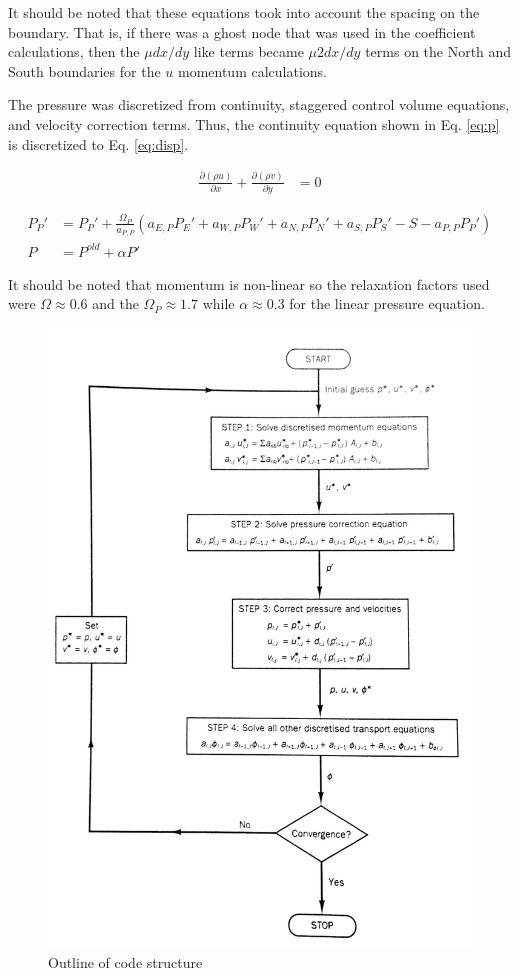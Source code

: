 \documentclass[cleanfoot,cleanhead,onecolumn,12pt,notitlepage]{asme2e}
\begin{document}
It should be noted that these equations took into account the spacing on the boundary.  That is, if there was a ghost node that was used in the coefficient calculations, then the $\mu dx/dy$ like terms became $\mu 2 dx / dy$ terms on the North and South boundaries for the $u$ momentum calculations.  

The pressure was discretized from continuity, staggered control volume equations, and velocity correction terms.   Thus, the continuity equation shown in Eq. \ref{eq:p} is discretized to Eq. \ref{eq:disp}.  

\begin{equation}
\begin{aligned}
\frac{\partial (\rho u)}{\partial x}
+
\frac{\partial (\rho v)}{\partial y} 
&= 0
\label{eq:p}
\end{aligned}
\end{equation}

\begin{equation}
\begin{aligned}
P_P' &= P_P' + \frac{\Omega_P}{a_{P,P}}
\left(a_{E,P} P_E'
	+ a_{W,P} P_W'
	+ a_{N,P} P_N'
	+ a_{S,P} P_S'
	- S
	- a_{P,P} P_P'
\right)\\
P &= P^{old} + \alpha P'
\label{eq:disp}
\end{aligned}
\end{equation}

It should be noted that momentum is non-linear so the relaxation factors used were $\Omega \approx 0.6$ and the $\Omega_P \approx 1.7$ while $\alpha \approx 0.3$ for the linear pressure equation.


\begin{figure}[h!]
\begin{center}
    \includegraphics[width=0.7\linewidth]{Code_Outline.jpg}
    \caption{Outline of code structure}
    \label{fig:codeoutline}
\end{center}
\end{figure}
\end{document}
